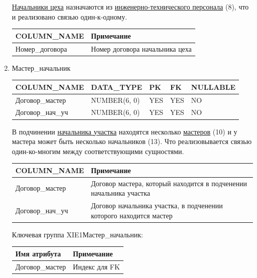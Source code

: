 \begin{enumerate}
    \underline{Начальники цеха} назначаются из \underline{инженерно-технического персонала} (8), что и реализовано связью один-к-одному.

    \begin{tabular}{|p{4cm}|p{5cm}|} \hline

        {\bf COLUMN\_NAME} & {\bf Примечание} \\ \hline
        Номер\_договора & Номер договора начальника цеха \\ \hline

    \end{tabular}

    \item Мастер\_начальник

    \begin{tabular}{|p{4cm}|p{3cm}|p{1cm}|p{1cm}|p{2cm}|} \hline

        {\bf COLUMN\_NAME} & {\bf DATA\_TYPE} & {\bf PK} & {\bf FK} & {\bf NULLABLE} \\ \hline
        Договор\_мастер & NUMBER(6, 0) & YES & YES & NO \\ \hline
        Договор\_нач\_уч & NUMBER(6, 0) & YES & YES & NO \\ \hline

    \end{tabular}

    В подчинении \underline{начальника участка} находятся несколько \underline{мастеров} (10) и у мастера может быть несколько начальников (13).
    Что реализовывается связью один-ко-многим между соответствующими сущностями.

    \begin{tabular}{|p{4cm}|p{5cm}|} \hline

        {\bf COLUMN\_NAME} & {\bf Примечание} \\ \hline
        Договор\_мастер & Договор мастера, который находится в подченении начальника участка \\ \hline
        Договор\_нач\_уч & Договор начальника участка, в подченении которого находится мастер \\ \hline

    \end{tabular}

    Ключевая группа XIE1Мастер\_начальник:

    \begin{tabular}{|p{4cm}|p{5cm}|} \hline

        {\bf Имя атрибута} & {\bf Примечание} \\ \hline
        Договор\_мастер & Индекс для FK \\ \hline


\end{tabular}
\end{enumerate}
